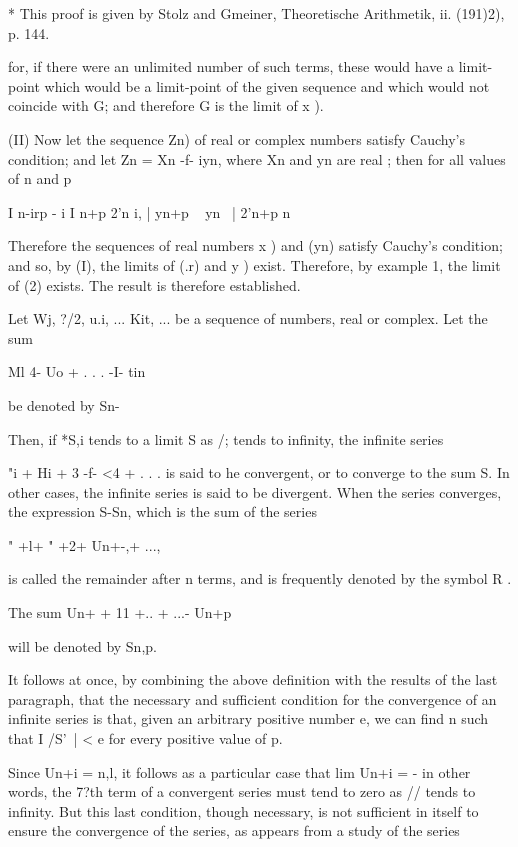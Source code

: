 * This proof is given by Stolz and Gmeiner, Theoretische Arithmetik,
ii. (191)2), p. 144.

%
%

for, if there were an unlimited number of such terms, these would have
a limit-point which would be a limit-point of the given sequence and
which would not coincide with G; and therefore G is the limit of x ).

(II) Now let the sequence Zn) of real or complex numbers satisfy
Cauchy's condition; and let Zn = Xn -f- iyn, where Xn and yn are real
; then for all values of n and p

I n-irp - i I n+p 2'n i, | yn+p ~ yn \ | 2'n+p n\-

Therefore the sequences of real numbers x ) and (yn) satisfy Cauchy's
condition; and so, by (I), the limits of (.r) and y ) exist.
Therefore, by  example 1, the limit of (2) exists. The result is
therefore established.


Let Wj, ?/2, u.i, ... Kit, ... be a sequence of numbers, real or
complex. Let the sum

Ml 4- Uo + . . . -I- tin

be denoted by Sn-

Then, if *S,i tends to a limit S as /; tends to infinity, the
infinite series

"i + Hi + 3 -f- <4 + . . . is said to he convergent, or to converge to
the sum S. In other cases, the infinite series is said to be
divergent. When the series converges, the expression S-Sn, which is
the sum of the series

" +l+ " +2+ Un+-,+ ...,

is called the remainder after n terms, and is frequently denoted by
the symbol R .

The sum Un+ + 11 +.. + ...-\- Un+p

will be denoted by Sn,p.

It follows at once, by combining the above definition with the results
of the last paragraph, that the necessary and sufficient condition for
the convergence of an infinite series is that, given an arbitrary
positive number e, we can find n such that I /S'\ | < e for every
positive value of p.

Since Un+i = n,l, it follows as a particular case that lim Un+i = - in
other words, the 7?th term of a convergent series must tend to zero as
// tends to infinity. But this last condition, though necessary, is
not sufficient in itself to ensure the convergence of the series, as
appears from a study of the series

